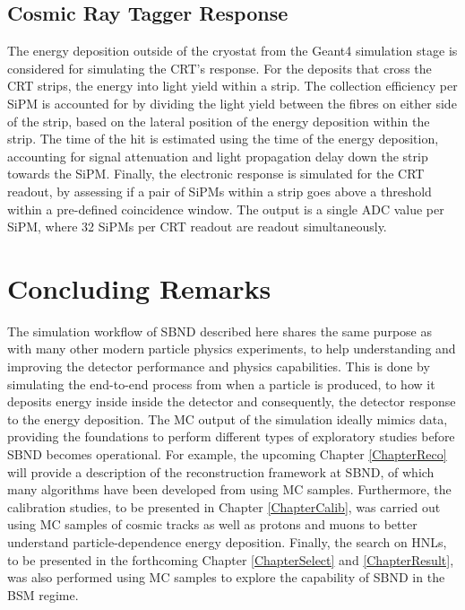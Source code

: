 \subsection{Cosmic Ray Tagger Response}

The energy deposition outside of the cryostat from the Geant4 simulation stage is considered for simulating the CRT's response.
For the deposits that cross the CRT strips, the energy into light yield within a strip.
The collection efficiency per SiPM is accounted for by dividing the light yield between the fibres on either side of the strip, based on the lateral position of the energy deposition within the strip. 
The time of the hit is estimated using the time of the energy deposition, accounting for signal attenuation and light propagation delay down the strip towards the SiPM.
Finally, the electronic response is simulated for the CRT readout, by assessing if a pair of SiPMs within a strip goes above a threshold within a pre-defined coincidence window.
The output is a single ADC value per SiPM, where 32 SiPMs per CRT readout are readout simultaneously. 


\section{Concluding Remarks}
\label{sec:sim_concluding_remarks}

The simulation workflow of SBND described here shares the same purpose as with many other modern particle physics experiments, to help understanding and improving the detector performance and physics capabilities.
This is done by simulating the end-to-end process from when a particle is produced, to how it deposits energy inside inside the detector and consequently, the detector response to the energy deposition.
The MC output of the simulation ideally mimics data, providing the foundations to perform different types of exploratory studies before SBND becomes operational.
For example, the upcoming Chapter \ref{ChapterReco} will provide a description of the reconstruction framework at SBND, of which many algorithms have been developed from using MC samples.
Furthermore, the calibration studies, to be presented in Chapter \ref{ChapterCalib}, was carried out using MC samples of cosmic tracks as well as protons and muons to better understand particle-dependence energy deposition.
Finally, the search on HNLs, to be presented in the forthcoming Chapter \ref{ChapterSelect} and \ref{ChapterResult}, was also performed using MC samples to explore the capability of SBND in the BSM regime.
